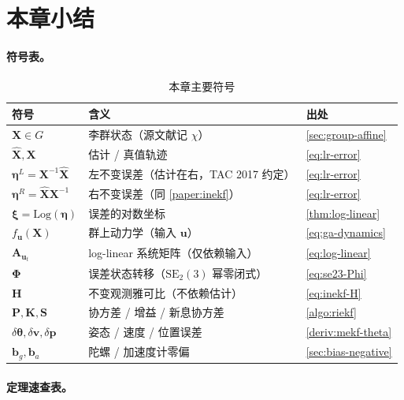 \section*{本章小结}

\paragraph{符号表。}

\begin{table}[H]\centering\small
\caption{本章主要符号}
\begin{tabular}{lll}
\toprule
符号 & 含义 & 出处 \\
\midrule
$\mathbf{X}\in G$ & 李群状态（源文献记 $\chi$） & \cref{sec:group-affine} \\
$\hat{\mathbf{X}},\mathbf{X}$ & 估计 / 真值轨迹 & \cref{eq:lr-error} \\
$\boldsymbol{\eta}^L=\mathbf{X}^{-1}\hat{\mathbf{X}}$ & 左不变误差（估计在右，TAC 2017 约定） & \cref{eq:lr-error} \\
$\boldsymbol{\eta}^R=\hat{\mathbf{X}}\mathbf{X}^{-1}$ & 右不变误差（同 \cref{paper:inekf}） & \cref{eq:lr-error} \\
$\boldsymbol{\xi}=\mathrm{Log}(\boldsymbol{\eta})$ & 误差的对数坐标 & \cref{thm:log-linear} \\
$f_{\mathbf{u}}(\mathbf{X})$ & 群上动力学（输入 $\mathbf{u}$） & \cref{eq:ga-dynamics} \\
$\mathbf{A}_{\mathbf{u}_t}$ & log-linear 系统矩阵（仅依赖输入） & \cref{eq:log-linear} \\
$\boldsymbol{\Phi}$ & 误差状态转移（$\mathrm{SE}_2(3)$ 幂零闭式） & \cref{eq:se23-Phi} \\
$\mathbf{H}$ & 不变观测雅可比（不依赖估计） & \cref{eq:inekf-H} \\
$\mathbf{P},\mathbf{K},\mathbf{S}$ & 协方差 / 增益 / 新息协方差 & \cref{algo:riekf} \\
$\delta\boldsymbol{\theta},\delta\mathbf{v},\delta\mathbf{p}$ & 姿态 / 速度 / 位置误差 & \cref{deriv:mekf-theta} \\
$\mathbf{b}_g,\mathbf{b}_a$ & 陀螺 / 加速度计零偏 & \cref{sec:bias-negative} \\
\bottomrule
\end{tabular}
\end{table}

\paragraph{定理速查表。}

